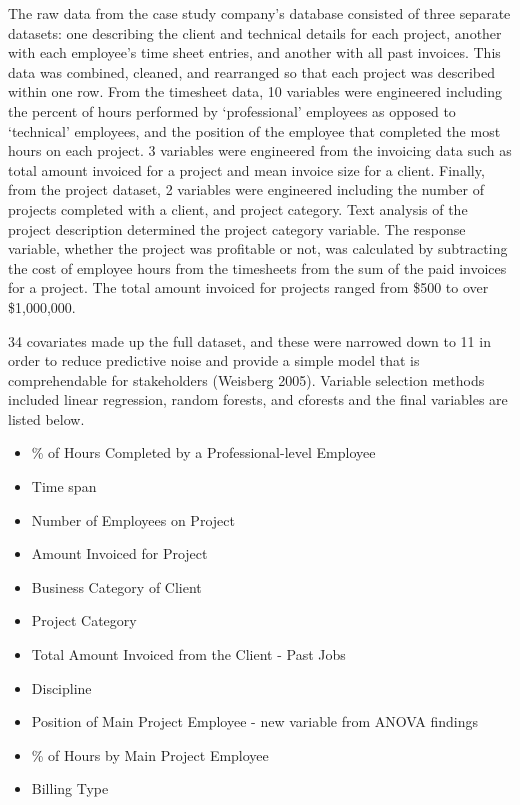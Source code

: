 \documentclass[]{elsarticle} %
\providecommand{\tightlist}{%
  \setlength{\itemsep}{0pt}\setlength{\parskip}{0pt}}
\begin{document}
The raw data from the case study company's database consisted of three
separate datasets: one describing the client and technical details for
each project, another with each employee's time sheet entries, and
another with all past invoices. This data was combined, cleaned, and
rearranged so that each project was described within one row. From the
timesheet data, 10 variables were engineered including the percent of
hours performed by `professional' employees as opposed to `technical'
employees, and the position of the employee that completed the most
hours on each project. 3 variables were engineered from the invoicing
data such as total amount invoiced for a project and mean invoice size
for a client. Finally, from the project dataset, 2 variables were
engineered including the number of projects completed with a client, and
project category. Text analysis of the project description determined
the project category variable. The response variable, whether the
project was profitable or not, was calculated by subtracting the cost of
employee hours from the timesheets from the sum of the paid invoices for
a project. The total amount invoiced for projects ranged from \$500 to
over \$1,000,000.

34 covariates made up the full dataset, and these were narrowed down to
11 in order to reduce predictive noise and provide a simple model that
is comprehendable for stakeholders (Weisberg 2005). Variable selection
methods included linear regression, random forests, and cforests and the
final variables are listed below.

\begin{itemize}
\tightlist
\item
  \% of Hours Completed by a Professional-level Employee
\item
  Time span
\item
  Number of Employees on Project
\item
  Amount Invoiced for Project
\item
  Business Category of Client
\item
  Project Category
\item
  Total Amount Invoiced from the Client - Past Jobs
\item
  Discipline
\item
  Position of Main Project Employee - new variable from ANOVA findings
\item
  \% of Hours by Main Project Employee
\item
  Billing Type
\end{itemize}
\end{document}
